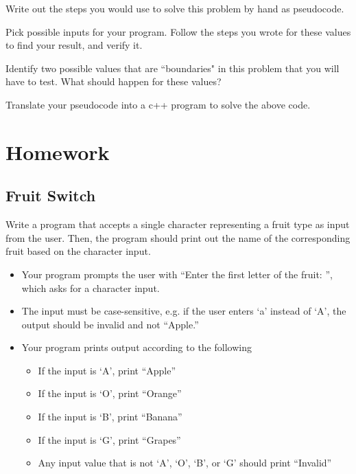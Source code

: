 \newpage

\begin{multipart}
    Write out the steps you would use to solve this problem by hand as pseudocode. 
\end{multipart}

\vspace{10cm}

\begin{multipart}
    Pick possible inputs for your program. Follow the steps you wrote for these values to find your result, and verify it.
\end{multipart}

\vspace{3.5cm}

\begin{multipart}
     Identify two possible values that are ``boundaries" in this problem that you will have to test. What should happen for these values?
\end{multipart}

\vspace{3.5cm}

\begin{multipart}
    Translate your pseudocode into a c++ program to solve the above code.
\end{multipart}


\section{Homework}

\subsection{Fruit Switch}

Write a program that accepts a single character representing a fruit type as input from the user. Then, the program should print out the name of the corresponding fruit based on the character input.

\begin{itemize}
\item Your program prompts the user with “Enter the first letter of the fruit: ”, which asks for a character input. 
\item The input must be case-sensitive, e.g. if the user enters ‘a’ instead of ‘A’, the output should be invalid and not “Apple.”
    \item Your program prints output according to the following
    \begin{itemize}
        \item If the input is ‘A’, print “Apple”
        \item If the input is ‘O’, print “Orange”
        \item If the input is ‘B’, print “Banana”
        \item If the input is ‘G’, print “Grapes”
        \item Any input value that is not ‘A’, ‘O’, ‘B’, or ‘G’ should print “Invalid”
    \end{itemize}
\end{itemize}



